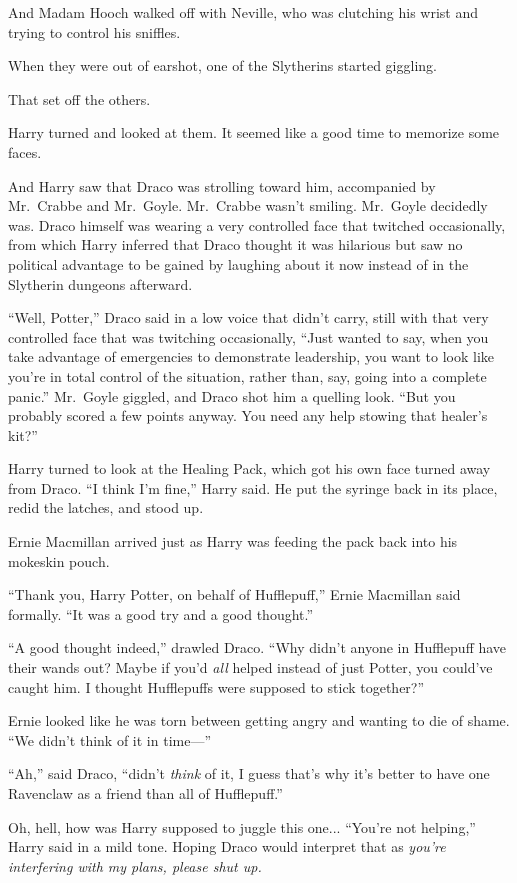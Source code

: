 And Madam Hooch walked off with Neville, who was clutching his wrist and trying to control his sniffles.

When they were out of earshot, one of the Slytherins started giggling.

That set off the others.

Harry turned and looked at them. It seemed like a good time to memorize some faces.

And Harry saw that Draco was strolling toward him, accompanied by Mr.~Crabbe and Mr.~Goyle. Mr.~Crabbe wasn’t smiling. Mr.~Goyle decidedly was. Draco himself was wearing a very controlled face that twitched occasionally, from which Harry inferred that Draco thought it was hilarious but saw no political advantage to be gained by laughing about it now instead of in the Slytherin dungeons afterward.

“Well, Potter,” Draco said in a low voice that didn’t carry, still with that very controlled face that was twitching occasionally, “Just wanted to say, when you take advantage of emergencies to demonstrate leadership, you want to look like you’re in total control of the situation, rather than, say, going into a complete panic.” Mr.~Goyle giggled, and Draco shot him a quelling look. “But you probably scored a few points anyway. You need any help stowing that healer’s kit?”

Harry turned to look at the Healing Pack, which got his own face turned away from Draco. “I think I’m fine,” Harry said. He put the syringe back in its place, redid the latches, and stood up.

Ernie Macmillan arrived just as Harry was feeding the pack back into his mokeskin pouch.

“Thank you, Harry Potter, on behalf of Hufflepuff,” Ernie Macmillan said formally. “It was a good try and a good thought.”

“A good thought indeed,” drawled Draco. “Why didn’t anyone in Hufflepuff have their wands out? Maybe if you’d \emph{all} helped instead of just Potter, you could’ve caught him. I thought Hufflepuffs were supposed to stick together?”

Ernie looked like he was torn between getting angry and wanting to die of shame. “We didn’t think of it in time—”

“Ah,” said Draco, “didn’t \emph{think} of it, I guess that’s why it’s better to have one Ravenclaw as a friend than all of Hufflepuff.”

Oh, hell, how was Harry supposed to juggle this one... “You’re not helping,” Harry said in a mild tone. Hoping Draco would interpret that as \emph{you’re interfering with my plans, please shut up.}

